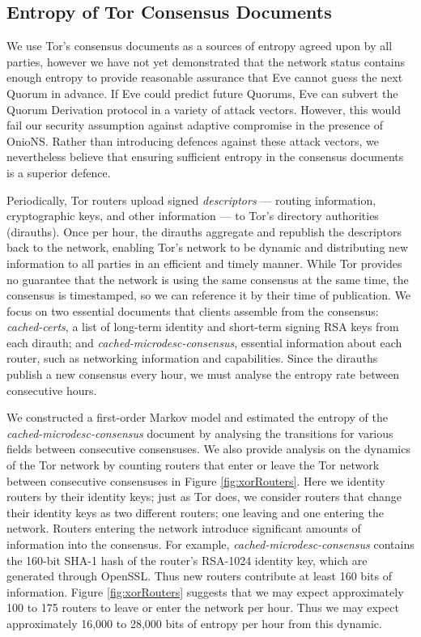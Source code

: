 \subsection{Entropy of Tor Consensus Documents}
\label{sec:docEntropy}

We use Tor's consensus documents as a sources of entropy agreed upon by all parties, however we have not yet demonstrated that the network status contains enough entropy to provide reasonable assurance that Eve cannot guess the next Quorum in advance. If Eve could predict future Quorums, Eve can subvert the Quorum Derivation protocol in a variety of attack vectors. However, this would fail our security assumption against adaptive compromise in the presence of OnioNS. Rather than introducing defences against these attack vectors, we nevertheless believe that ensuring sufficient entropy in the consensus documents is a superior defence.

Periodically, Tor routers upload signed \emph{descriptors} --- routing information, cryptographic keys, and other information --- to Tor's directory authorities (dirauths). Once per hour, the dirauths aggregate and republish the descriptors back to the network, enabling Tor's network to be dynamic and distributing new information to all parties in an efficient and timely manner. While Tor provides no guarantee that the network is using the same consensus at the same time, the consensus is timestamped, so we can reference it by their time of publication. We focus on two essential documents that clients assemble from the consensus: \emph{cached-certs}, a list of long-term identity and short-term signing RSA keys from each dirauth; and \emph{cached-microdesc-consensus}, essential information about each router, such as networking information and capabilities. Since the dirauths publish a new consensus every hour, we must analyse the entropy rate between consecutive hours.

We constructed a first-order Markov model and estimated the entropy of the \emph{cached-microdesc-consensus} document by analysing the transitions for various fields between consecutive consensuses. We also provide analysis on the dynamics of the Tor network by counting routers that enter or leave the Tor network between consecutive consensuses in Figure \ref{fig:xorRouters}. Here we identity routers by their identity keys; just as Tor does, we consider routers that change their identity keys as two different routers; one leaving and one entering the network. Routers entering the network introduce significant amounts of information into the consensus. For example, \emph{cached-microdesc-consensus} contains the 160-bit SHA-1 hash of the router's RSA-1024 identity key, which are generated through OpenSSL. Thus new routers contribute at least 160 bits of information. Figure \ref{fig:xorRouters} suggests that we may expect approximately 100 to 175 routers to leave or enter the network per hour. Thus we may expect approximately 16,000 to 28,000 bits of entropy per hour from this dynamic.

